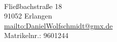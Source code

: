 \documentclass[german,11pt,a4paper]{article} %
\begin{document}
\vspace{1,5cm}

\begin{center}
\begin{large}
\author{Daniel Wolfschmidt}\\
\end{large}
Fließbachstraße 18\\ 
91052 Erlangen\\ 
\url{mailto:DanielWolfschmidt@gmx.de}\\
Matrikelnr.: 9601244  \\
\end{center}



\newpage
\setcounter{page}{1}
\tableofcontents
\newpage
\listoffigures
\newpage


\pagestyle{fancy}
\fancyhf{}
\fancyhead[R]{\thepage}
\renewcommand{\headrulewidth}{0pt} %
\end{document}
